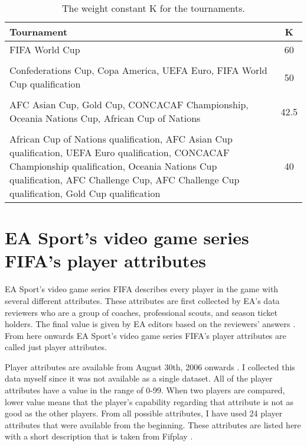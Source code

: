 \begin{table}
    \centering
    \caption{The weight constant $\mathrm { K }$ for the tournaments.}
    \label{table:weight_constant}
    \begin{tabular}{|L|c|}\hline
        \textbf{Tournament} & \textbf{K} \\\hline
        FIFA World Cup & 60 \\
        & \\
        Confederations Cup, Copa America, UEFA Euro, FIFA World Cup qualification & 50 \\
        & \\
        AFC Asian Cup, Gold Cup, CONCACAF Championship, Oceania Nations Cup, African Cup of Nations &42.5\\
        & \\
        African Cup of Nations qualification, AFC Asian Cup qualification, UEFA Euro qualification, CONCACAF Championship qualification, Oceania Nations Cup qualification, AFC Challenge Cup, AFC Challenge Cup qualification, Gold Cup qualification &  40 \\ \hline
    \end{tabular}
\end{table}

\section{EA Sport’s video game series FIFA's player attributes}
EA Sport's video game series FIFA describes every player in the game with several different attributes. These attributes are first collected by EA's data reviewers who are a group of coaches, professional scouts, and season ticket holders. The final value is given by EA editors based on the reviewers' answers \cite{playerattr}. From here onwards EA Sport's video game series FIFA's player attributes are called just player attributes.

Player attributes are available from August 30th, 2006 onwards \cite{sofifa}. I collected this data myself since it was not available as a single dataset.
All of the player attributes have a value in the range of 0-99. When two players are compared, lower value means that the player's capability regarding that attribute is not as good as the other players. From all possible attributes, I have used 24 player attributes that were available from the beginning. These attributes are listed here with a short description that is taken from Fifplay \cite{playerattr}.

